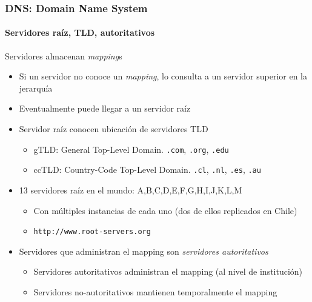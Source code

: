 \documentclass[letter]{beamer}
\begin{document}
\begin{frame}
  \frametitle{DNS: Domain Name System}
  \framesubtitle{Servidores raíz, TLD, autoritativos}
  
  Servidores almacenan {\em mapping}s 
  \begin{itemize}
    \item Si un servidor no conoce un {\em mapping}, lo consulta a un servidor superior en la jerarquía
    \item Eventualmente puede llegar a un servidor raíz
    \item Servidor raíz conocen ubicación de servidores TLD
      \begin{itemize}
        \item gTLD: General Top-Level Domain. {\tt .com}, {\tt .org}, {\tt .edu} 
        \item ccTLD: Country-Code Top-Level Domain. {\tt .cl}, {\tt .nl}, {\tt .es}, {\tt .au}
      \end{itemize}
    \item 13 servidores raíz en el mundo: A,B,C,D,E,F,G,H,I,J,K,L,M
      \begin{itemize}
        \item Con múltiples instancias de cada uno (dos de ellos replicados en Chile)
        \item {\tt http://www.root-servers.org}
      \end{itemize}
    \item Servidores que administran el mapping son {\em servidores autoritativos}
      \begin{itemize}
        \item Servidores autoritativos administran el mapping (al nivel de institución)
        \item Servidores no-autoritativos mantienen temporalmente el mapping
      \end{itemize}
  \end{itemize}

\end{frame}
\end{document}

